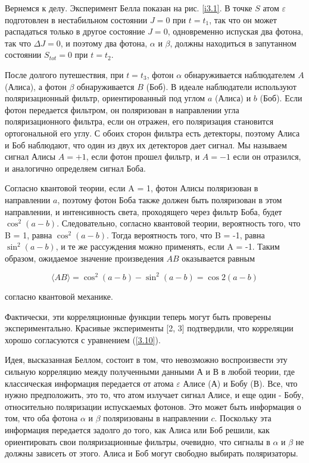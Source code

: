 \documentclass[main.tex]{subfiles}
\begin{document}
Вернемся к делу. Эксперимент Белла показан на рис. \ref{i3.1}. В точке $S$ атом $\varepsilon$ подготовлен в нестабильном состоянии $J = 0$ при $t = t_1$, так что он может распадаться только в другое состояние $J = 0$, одновременно испуская два фотона, так что $\Delta J = 0$, и поэтому два фотона, $\alpha$ и $\beta$, должны находиться в запутанном состоянии $S_{tot} = 0$ при $t = t_2$.

После долгого путешествия, при $t = t_3$, фотон $\alpha$ обнаруживается наблюдателем $A$ (Алиса), а фотон $\beta$ обнаруживается $B$ (Боб). В идеале наблюдатели используют поляризационный фильтр, ориентированный под углом $a$ (Алиса) и $b$ (Боб). Если фотон передается фильтром, он поляризован в направлении угла поляризационного фильтра, если он отражен, его поляризация становится ортогональной его углу. С обоих сторон фильтра есть детекторы, поэтому Алиса и Боб наблюдают, что один из двух их детекторов дает сигнал. Мы называем сигнал Алисы $A = + 1$, если фотон прошел фильтр, и $A = -1$ если он отразился, и аналогично определяем сигнал Боба.

Согласно квантовой теории, если A = 1, фотон Алисы поляризован в направлении $a$, поэтому фотон Боба также должен быть поляризован в этом направлении, и интенсивность света, проходящего через фильтр Боба, будет $\cos^2 (a - b)$. Следовательно, согласно квантовой теории, вероятность того, что B = 1, равна $\cos^2 (a - b)$. Тогда вероятность того, что B = -1, равна $\sin^2 (a - b)$, и те же рассуждения можно применять, если A = -1. Таким образом, ожидаемое значение произведения $AB$ оказывается равным

\begin{equation}\label{3.10}
	\langle A B\rangle=\cos ^{2}(a-b)-\sin ^{2}(a-b)=\cos 2(a-b)
\end{equation}
            
согласно квантовой механике.
 
Фактически, эти корреляционные функции теперь могут быть проверены экспериментально. Красивые эксперименты [2, 3] подтвердили, что корреляции хорошо согласуются с уравнением (\ref{3.10}).

Идея, высказанная Беллом, состоит в том, что невозможно воспроизвести эту сильную корреляцию между полученными данными А и В в любой теории, где классическая информация передается от атома $\varepsilon$ Алисе (А) и Бобу (В). Все, что нужно предположить, это то, что атом излучает сигнал Алисе, и еще один - Бобу, относительно поляризации испускаемых фотонов. Это может быть информация о том, что оба фотона $\alpha$ и $\beta$ поляризованы в направлении $c$. Поскольку эта информация передается задолго до того, как Алиса или Боб решили, как ориентировать свои поляризационные фильтры, очевидно, что сигналы в $\alpha$ и $\beta$ не должны зависеть от этого. Алиса и Боб могут свободно выбирать поляризаторы.
\end{document}
